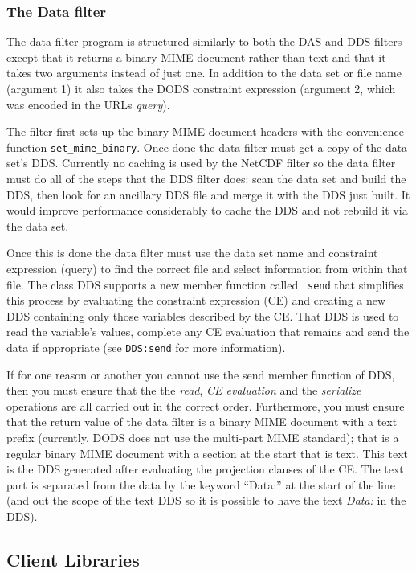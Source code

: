 \subsubsection{The Data filter}

The data filter program is structured similarly to both the DAS and DDS
filters except that it returns a binary MIME document rather than text and
that it takes two arguments instead of just one. In addition to the data set
or file name (argument 1) it also takes the DODS constraint expression
(argument 2, which was encoded in the URLs {\em query\/}).

The filter first sets up the binary MIME document headers with the
convenience function {\tt set\_mime\_binary}. Once done the data filter must
get a copy of the data set's DDS. Currently no caching is used by the NetCDF
filter so the data filter must do all of the steps that the DDS filter does:
scan the data set and build the DDS, then look for an ancillary DDS file and
merge it with the DDS just built. It would improve performance considerably
to cache the DDS and not rebuild it via the data set.

Once this is done the data filter must use the data set name and constraint
expression (query) to find the correct file and select information from
within that file. The class DDS supports a new member function called {\tt
  send} that simplifies this process by evaluating the constraint expression
(CE) and creating a new DDS containing only those variables described by the
CE. That DDS is used to read the variable's values, complete any CE
evaluation that remains and send the data if appropriate (see {\tt DDS:send}
for more information).

If for one reason or another you cannot use the send member function of DDS,
then you must ensure that the the {\em read\/}, {\em CE evaluation\/} and the
{\em serialize\/} operations are all carried out in the correct order.
Furthermore, you must ensure that the return value of the data filter is a
binary MIME document with a text prefix (currently, DODS does not use the
multi-part MIME standard); that is a regular binary MIME document with a
section at the start that is text. This text is the DDS generated after
evaluating the projection clauses of the CE. The text part is separated from
the data by the keyword ``Data:'' at the start of the line (and out the scope
of the text DDS so it is possible to have the text {\em Data:\/} in the DDS).

\subsection{Client Libraries}

